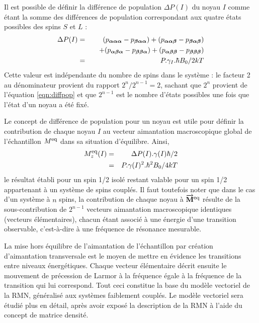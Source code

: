 Il est possible de définir la différence de population $\Delta P(I)$ du noyau
$I$ comme étant la somme des différences de population correspondant
aux quatre états possibles des spins $S$ et $L$ :
\begin{eqnarray}
\Delta P(I) & = & (p_{\boldsymbol{\alpha} \boldsymbol{\alpha} \boldsymbol{\alpha}} -p_{\boldsymbol{\beta} \boldsymbol{\alpha} \boldsymbol{\alpha}}) + (p_{\boldsymbol{\alpha} \boldsymbol{\alpha} \boldsymbol{\beta}} -p_{\boldsymbol{\beta} \boldsymbol{\alpha} \boldsymbol{\beta}})
\nonumber\\
& & \quad + (p_{\boldsymbol{\alpha} \boldsymbol{\beta} \boldsymbol{\alpha}} -p_{\boldsymbol{\beta} \boldsymbol{\beta} \boldsymbol{\alpha}}) + (p_{\boldsymbol{\alpha} \boldsymbol{\beta} \boldsymbol{\beta}} -p_{\boldsymbol{\beta} \boldsymbol{\beta} \boldsymbol{\beta}}) \\
& = & P.\gamma_I.\hbar B_0/2kT
\end{eqnarray}
Cette valeur est indépendante du nombre de spins dans le système : le facteur 2
au dénominateur provient du rapport $2^n/2^{n-1} = 2$, sachant que $2^n$ provient
de l'équation \ref{eqn:diffpop} et que $2^{n-1}$ est le nombre d'états possibles
une fois que l'état d'un noyau a été fixé.

Le concept de différence de population pour un noyau est utile pour définir
la contribution de chaque noyau $I$ au vecteur aimantation macroscopique
global de l'échantillon $M^{\mbox{\footnotesize{eq}}}$ dans sa situation d'équilibre.
Ainsi,
\begin{eqnarray}
M^{\mbox{\footnotesize{eq}}}_z(I) & = & \Delta P(I) . \gamma(I)\hbar/2 \\
& = & P.\gamma(I)^2.\hbar^2 B_0/4kT
\end{eqnarray}
le résultat établi pour un spin 1/2 isolé restant valable pour un spin 1/2
appartenant à un système de spins couplés.
Il faut toutefois noter que dans le cas d'un système à $n$ spins, 
la contribution de chaque noyau à $\overrightarrow{\mathbf{M}}^{\mbox{\footnotesize{eq}}}$
résulte de la sous-contribution de $2^{n-1}$ vecteurs aimantation macroscopique
identiques (vecteurs élémentaires), 
chacun étant associé à une énergie d'une transition observable,
c'est-à-dire à une fréquence de résonance mesurable.

La mise hors équilibre de l'aimantation de l'échantillon par création
d'aimantation transversale est le moyen de mettre en évidence
les transitions entre niveaux énergétiques.
Chaque vecteur élémentaire décrit ensuite le mouvement de précession de Larmor
à la fréquence égale à la fréquence de la transition qui lui correspond.
Tout ceci constitue la base du modèle vectoriel de la RMN, généralisé aux systèmes
faiblement couplés. Le modèle vectoriel sera étudié plus en détail, après avoir
exposé la description de la RMN à l'aide du concept de matrice densité.
